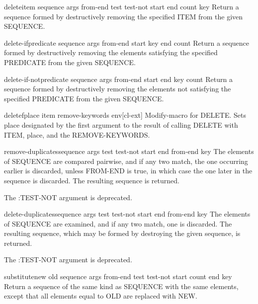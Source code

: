 \documentclass[10pt,english]{book}
\begin{document}
\begin{function}{delete}{item sequence \rest args \key from-end test test-not start end count key}
  Return a sequence formed by destructively removing the specified ITEM from
  the given SEQUENCE.
\end{function}

\begin{function}{delete-if}{predicate sequence \rest args \key from-end start key end count}
  Return a sequence formed by destructively removing the elements satisfying
  the specified PREDICATE from the given SEQUENCE.
\end{function}

\begin{function}{delete-if-not}{predicate sequence \rest args \key from-end start end key count}
  Return a sequence formed by destructively removing the elements not
  satisfying the specified PREDICATE from the given SEQUENCE.
\end{function}

\begin{macro}{deletef}{place item \rest remove-keywords \env env}[cl-ext]
  Modify-macro for DELETE. Sets place designated by the first argument
  to the result of calling DELETE with ITEM, place, and the
  REMOVE-KEYWORDS.
\end{macro}

\begin{function}{remove-duplicates}{sequence \rest args \key test test-not start end from-end key}
  The elements of SEQUENCE are compared pairwise, and if any two match,
  the one occurring earlier is discarded, unless FROM-END is true, in
  which case the one later in the sequence is discarded. The resulting
  sequence is returned.

  The :TEST-NOT argument is deprecated.
\end{function}

\begin{function}{delete-duplicates}{sequence \rest args \key test test-not start end from-end key}
  The elements of SEQUENCE are examined, and if any two match, one is
  discarded. The resulting sequence, which may be formed by destroying the
  given sequence, is returned.

  The :TEST-NOT argument is deprecated.
\end{function}

\begin{function}{substitute}{new old sequence \rest args \key from-end test test-not start count end key}
  Return a sequence of the same kind as SEQUENCE with the same elements,
  except that all elements equal to OLD are replaced with NEW.
\end{function}
\end{document}

